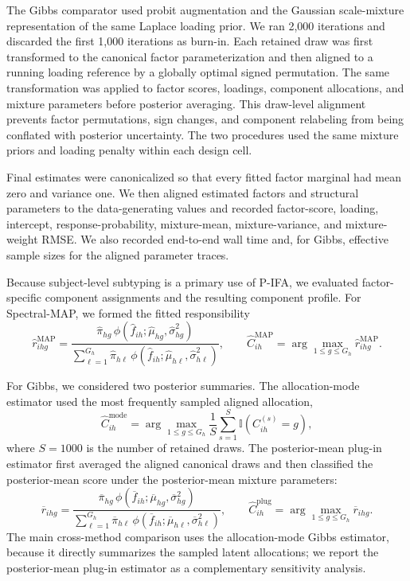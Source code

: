 The Gibbs comparator used probit augmentation and the Gaussian scale-mixture
representation of the same Laplace loading prior. We ran 2,000 iterations and
discarded the first 1,000 iterations as burn-in. Each retained draw was first
transformed to the canonical factor parameterization and then aligned to a
running loading reference by a globally optimal signed permutation. The same
transformation was applied to factor scores, loadings, component allocations,
and mixture parameters before posterior averaging. This draw-level alignment
prevents factor permutations, sign changes, and component relabeling from
being conflated with posterior uncertainty. The two procedures used the same
mixture priors and loading penalty within each design cell.

Final estimates were canonicalized so that every fitted factor marginal had
mean zero and variance one. We then aligned estimated factors and structural
parameters to the data-generating values and recorded factor-score, loading,
intercept, response-probability, mixture-mean, mixture-variance, and
mixture-weight RMSE. We also recorded end-to-end wall time and, for Gibbs,
effective sample sizes for the aligned parameter traces.

Because subject-level subtyping is a primary use of P-IFA, we evaluated
factor-specific component assignments and the resulting component profile.
For Spectral-MAP, we formed the fitted responsibility
\begin{equation}
\widehat r_{ihg}^{\mathrm{MAP}}
=
\frac{
\widehat\pi_{hg}\,
\phi(\widehat f_{ih};\widehat\mu_{hg},\widehat\sigma_{hg}^{2})
}{
\sum_{\ell=1}^{G_h}
\widehat\pi_{h\ell}\,
\phi(\widehat f_{ih};\widehat\mu_{h\ell},\widehat\sigma_{h\ell}^{2})
},
\qquad
\widehat C_{ih}^{\mathrm{MAP}}
=\arg\max_{1\leq g\leq G_h}\widehat r_{ihg}^{\mathrm{MAP}}.
\label{eq:map_subtype_assignment}
\end{equation}

For Gibbs, we considered two posterior summaries. The allocation-mode
estimator used the most frequently sampled aligned allocation,
\begin{equation}
\widehat C_{ih}^{\mathrm{mode}}
=
\arg\max_{1\leq g\leq G_h}
\frac{1}{S}\sum_{s=1}^{S}
\mathbb{I}\!\left(C_{ih}^{(s)}=g\right),
\label{eq:gibbs_mode_subtype}
\end{equation}
where $S=1000$ is the number of retained draws. The posterior-mean plug-in
estimator first averaged the aligned canonical draws and then classified the
posterior-mean score under the posterior-mean mixture parameters:
\begin{equation}
\overline r_{ihg}
=
\frac{
\overline\pi_{hg}\,
\phi(\overline f_{ih};\overline\mu_{hg},\overline\sigma_{hg}^{2})
}{
\sum_{\ell=1}^{G_h}
\overline\pi_{h\ell}\,
\phi(\overline f_{ih};\overline\mu_{h\ell},\overline\sigma_{h\ell}^{2})
},
\qquad
\widehat C_{ih}^{\mathrm{plug}}
=\arg\max_{1\leq g\leq G_h}\overline r_{ihg}.
\label{eq:gibbs_plugin_subtype}
\end{equation}
The main cross-method comparison uses the allocation-mode Gibbs estimator,
because it directly summarizes the sampled latent allocations; we report the
posterior-mean plug-in estimator as a complementary sensitivity analysis.

